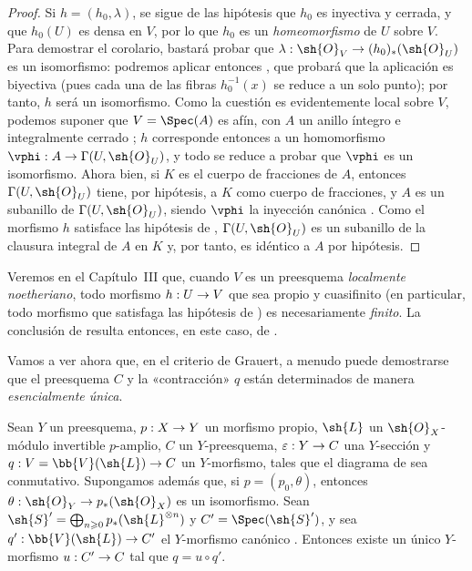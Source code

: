 \documentclass[oneside,10pt]{amsart}
\makeatletter
\renewcommand{\geq}{\geqslant}
\newcommand{\ega@arrow}[2]{\mathchoice{#1}{#2}{#2}{#2}}
\renewcommand{\to}{\ega@arrow{\longrightarrow}{\rightarrow}}
\newcommand{\oldpage}[2][]{\marginnote{\normalfont\footnotesize\textbf{#1}~|~#2}\ignorespaces}
\let\EGAOriginalLabel\label
\renewcommand{\label}[1]{\phantomsection\EGAOriginalLabel{#1}}
\makeatother
\begin{document}
\begin{proof}
Si $h=(h_0,\lambda)$, se sigue de las hipótesis que $h_0$ es inyectiva y cerrada, y que $h_0(U)$
\oldpage[II]{190}
es densa en $V$, por lo que $h_0$ es un \emph{homeomorfismo} de $U$ sobre $V$.
Para demostrar el corolario, bastará probar que $\lambda:\sh{O}_V\to(h_0)_*(\sh{O}_U)$ es un isomorfismo: podremos aplicar entonces , que probará que la aplicación  es biyectiva (pues cada una de las fibras $h_0^{-1}(x)$ se reduce a un solo punto);
por tanto, $h$ será un isomorfismo.
Como la cuestión es evidentemente local sobre $V$, podemos suponer que $V=\Spec(A)$ es afín, con $A$ un anillo íntegro e integralmente cerrado ;
$h$ corresponde entonces  a un homomorfismo $\vphi:A\to\Gamma(U,\sh{O}_U)$, y todo se reduce a probar que $\vphi$ es un isomorfismo.
Ahora bien, si $K$ es el cuerpo de fracciones de $A$, entonces $\Gamma(U,\sh{O}_U)$ tiene, por hipótesis, a $K$ como cuerpo de fracciones, y $A$ es un subanillo de $\Gamma(U,\sh{O}_U)$, siendo $\vphi$ la inyección canónica .
Como el morfismo $h$ satisface las hipótesis de , $\Gamma(U,\sh{O}_U)$ es un subanillo de la clausura integral de $A$ en $K$ y, por tanto, es idéntico a $A$ por hipótesis.
\end{proof}

\begin{remark}[8.11.3]
\label{II.8.11.3}
Veremos en el Capítulo~III  que, cuando $V$ es un preesquema \emph{localmente noetheriano}, todo morfismo $h:U\to V$ que sea propio y cuasifinito (en particular, todo morfismo que satisfaga las hipótesis de ) es necesariamente \emph{finito}.
La conclusión de  resulta entonces, en este caso, de .
\end{remark}

\begin{env}[8.11.4]
\label{II.8.11.4}
Vamos a ver ahora que, en el criterio de Grauert, a menudo puede demostrarse que el preesquema $C$ y la «contracción» $q$ están determinados de manera \emph{esencialmente única}.
\end{env}

\begin{lemma}[8.11.5]
\label{II.8.11.5}
Sean $Y$ un preesquema, $p:X\to Y$ un morfismo propio, $\sh{L}$ un $\sh{O}_X$-módulo invertible $p$-amplio, $C$ un $Y$-preesquema, $\varepsilon:Y\to C$ una $Y$-sección y $q:V=\bb{V}(\sh{L})\to C$ un $Y$-morfismo, tales que el diagrama de  sea conmutativo.
Supongamos además que, si $p=(p_0,\theta)$, entonces $\theta:\sh{O}_Y\to p_*(\sh{O}_X)$ es un isomorfismo.
Sean $\sh{S}'=\bigoplus_{n\geq0}p_*(\sh{L}^{\otimes n})$ y $C'=\Spec(\sh{S}')$, y sea $q':\bb{V}(\sh{L})\to C'$ el $Y$-morfismo canónico .
Entonces existe un único $Y$-morfismo $u:C'\to C$ tal que $q=u\circ q'$.
\end{lemma}
\end{document}
